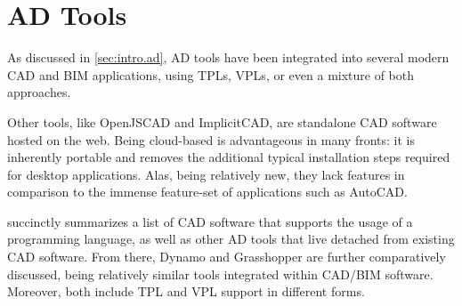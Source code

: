 \section{\acl{AD} Tools}%
\label{sec:related.ad}

As discussed in \cref{sec:intro.ad}, \ac{AD} tools have been integrated into
several modern \ac{CAD} and \ac{BIM} applications, using \acp{TPL}, \acp{VPL},
or even a mixture of both approaches.

Other tools, like OpenJSCAD and ImplicitCAD, are standalone \ac{CAD} software
hosted on the web.  Being cloud-based is advantageous in many fronts: it is
inherently portable and removes the additional typical installation steps
required for desktop applications.  Alas, being relatively new, they lack
features in comparison to the immense feature-set of applications such as
AutoCAD\@.

 succinctly summarizes a list of \ac{CAD} software
that supports the usage of a programming language, as well as other \ac{AD}
tools that live detached from existing \ac{CAD} software.  From there, Dynamo
and Grasshopper are further comparatively discussed, being relatively similar
tools integrated within \ac{CAD}/\ac{BIM} software.  Moreover, both include
\ac{TPL} and \ac{VPL} support in different forms.

